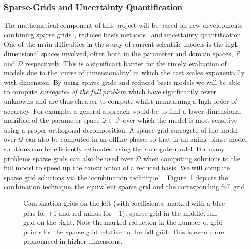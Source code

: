 \subsubsection*{Sparse-Grids and Uncertainty Quantification}

The mathematical component of this project will be based on new
developments combining sparse
grids~\parencite{BungartzGriebel2004}, reduced basis
methods~\parencite{LiebermanEtal2010,Peherstorfer2013,ChenSchwab2015,PeherstorferWillcox2015}
and uncertainty quantification. One of the main difficulties in the
study of current scientific models is the high dimensional spaces
involved, often both in the parameter and domain spaces, $\mathcal{P}$
and $\mathcal{D}$ respectively. This is a significant barrier for the
timely evaluation of models due to the `curse of dimensionality' in
which the cost scales exponentially with dimension. By using sparse
grids and reduced basis models we will be able to compute
\emph{surrogates of the full problem} which have significantly fewer
unknowns and are thus cheaper to compute whilst maintaining a high
order of accuracy. For example, a general approach would be to find a
lower dimensional manifold of the parameter space
$\mathcal{Q}\subset\mathcal{P}$ over which the model is most sensitive
using a proper orthogonal decomposition. A sparse grid surrogate of
the model over $\mathcal{Q}$ can also be computed in an offline phase,
so that in an online phase model solutions can be efficiently
estimated using the surrogate model. For many problems sparse grids
can also be used over $\mathcal{D}$ when computing solutions to the full
model to speed up the construction of a reduced basis. We will compute
sparse grid solutions via the `combination
technique'~\parencite{Griebel1990}. Figure~\ref{fig:sparse_grids}
depicts the combination technique, the equivalent sparse grid and the
corresponding full grid.

\begin{figure}
  \centering
    
  \caption{Combination grids on the left (with coefficients, marked with
    a blue plus for $+1$ and red minus for $-1$), sparse grid in the
    middle, full grid on the right. Note the marked reduction in the number of 
    grid points for the sparse grid relative to the full grid. 
   This is even more pronounced in higher dimensions.}
  \label{fig:sparse_grids}
\end{figure}

